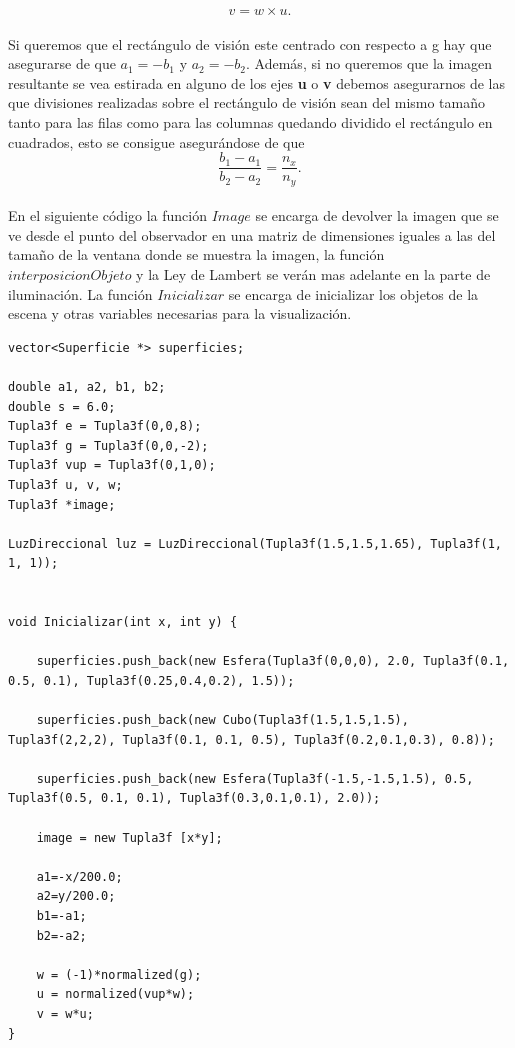 	\[
		v = w \times u.
	\]
	${ }$\\
	
Si queremos que el rectángulo de visión este centrado con respecto a g hay que asegurarse de que $a_1 = -b_1$ y $a_2 = -b_2$. Además, si no queremos que la imagen resultante se vea estirada en alguno de los ejes \textbf{u} o \textbf{v} debemos asegurarnos de las que divisiones realizadas sobre el rectángulo de visión sean del mismo tamaño tanto para las filas como para las columnas quedando dividido el rectángulo en cuadrados, esto se consigue asegurándose de que
${ }$\\
	\[
		\frac{b_1-a_1}{b_2 - a_2} = \frac{n_x}{n_y}.
	\]
	${ }$\\

En el siguiente código la función $Image$ se encarga de devolver la imagen que se ve desde el punto del observador en una matriz de dimensiones iguales a las del tamaño de la ventana donde se muestra la imagen, la función $interposicionObjeto$ y la Ley de Lambert se verán mas adelante en la parte de iluminación. La función $Inicializar$ se encarga de inicializar los objetos de la escena y otras variables necesarias para la visualización.
${ }$\\

\begin{lstlisting}[style=Consola]
vector<Superficie *> superficies;

double a1, a2, b1, b2;
double s = 6.0;
Tupla3f e = Tupla3f(0,0,8);
Tupla3f g = Tupla3f(0,0,-2);
Tupla3f vup = Tupla3f(0,1,0);
Tupla3f u, v, w;
Tupla3f *image;

LuzDireccional luz = LuzDireccional(Tupla3f(1.5,1.5,1.65), Tupla3f(1, 1, 1));


void Inicializar(int x, int y) {

	superficies.push_back(new Esfera(Tupla3f(0,0,0), 2.0, Tupla3f(0.1, 0.5, 0.1), Tupla3f(0.25,0.4,0.2), 1.5));
	
	superficies.push_back(new Cubo(Tupla3f(1.5,1.5,1.5), Tupla3f(2,2,2), Tupla3f(0.1, 0.1, 0.5), Tupla3f(0.2,0.1,0.3), 0.8));
	
	superficies.push_back(new Esfera(Tupla3f(-1.5,-1.5,1.5), 0.5, Tupla3f(0.5, 0.1, 0.1), Tupla3f(0.3,0.1,0.1), 2.0));
	
	image = new Tupla3f [x*y];

	a1=-x/200.0;
	a2=y/200.0;
	b1=-a1;
	b2=-a2;

	w = (-1)*normalized(g);
	u = normalized(vup*w);
	v = w*u;
}

\end{lstlisting}
${ }$\\


